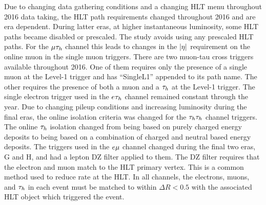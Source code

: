 Due to changing data gathering conditions and a changing HLT menu throughout 2016 data taking, the HLT path
requirements changed throughout 2016 and are era dependent. During latter eras, at higher instantaneous 
luminosity, some HLT paths became disabled or prescaled. The study avoids using any prescaled
HLT paths. For the $\mu\tau_{h}$ channel this 
leads to changes in the $\lvert\eta\rvert$ requirement on the online muon in the single muon triggers.
There are two muon-tau cross triggers available throughout 2016. One of them requires only the
presence of a single muon at the Level-1 trigger and has ``SingleL1'' appended to its path
name. The other requires the presence of both a muon and a $\tau_{h}$ at the Level-1 trigger.
The single electron trigger used in the $e\tau_{h}$ channel remained constant through the year.
Due to changing pileup conditions and increasing luminosity during the final eras, the online
isolation criteria was changed for the $\tau_{h}\tau_{h}$ channel triggers. The online $\tau_{h}$ 
isolation changed from being based on purely charged energy deposits to being based on a 
combination of charged and neutral based energy deposits. The triggers used in the
$e\mu$ channel changed during the final two eras, G and H, and had a lepton DZ filter
applied to them. The DZ filter requires that the electron and muon match to the HLT primary
vertex. This is a common method used to reduce rate at the HLT. In all channels, the electrons, muons, and
$\tau_{h}$ in each event must be matched to within $\Delta R < 0.5$ with the associated
HLT object which triggered the event.


